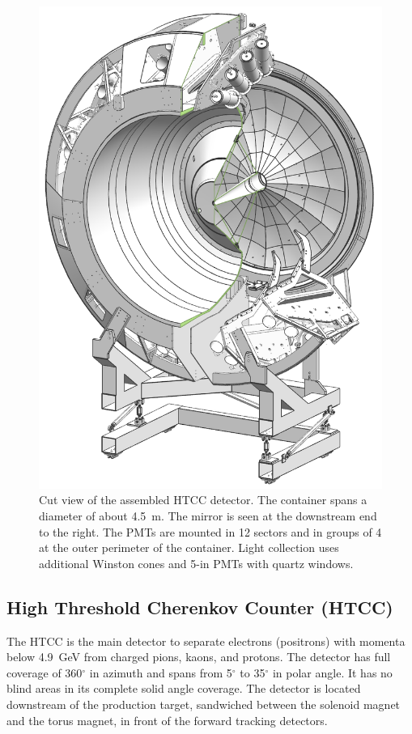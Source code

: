 \documentclass[final,3p,twocolumn]{elsarticle}
\begin{document}
\begin{figure}[htbp!]
\centerline{\includegraphics[width=0.9\columnwidth]{htcc-view-3.png}}
\caption{Cut view of the assembled HTCC detector. The container spans a diameter of about 4.5~m. The mirror is
seen at the downstream end to the right. The PMTs are mounted in 12 sectors and in groups of 4 at the outer
perimeter of the container. Light collection uses additional Winston cones and 5-in PMTs with quartz windows.}
\label{HTCC-container}
\end{figure}

\subsection{High Threshold Cherenkov Counter (HTCC)}

The HTCC is the main detector to separate electrons (positrons) with momenta below 4.9~GeV from charged pions,
kaons, and protons. The detector has full coverage of 360$^\circ$ in azimuth and spans from 5$^\circ$ to 35$^\circ$
in polar angle. It has no blind areas in its complete solid angle coverage. The detector is located downstream of the
production target, sandwiched between the solenoid magnet and the torus magnet, in front of the forward tracking
detectors. 
\end{document}
